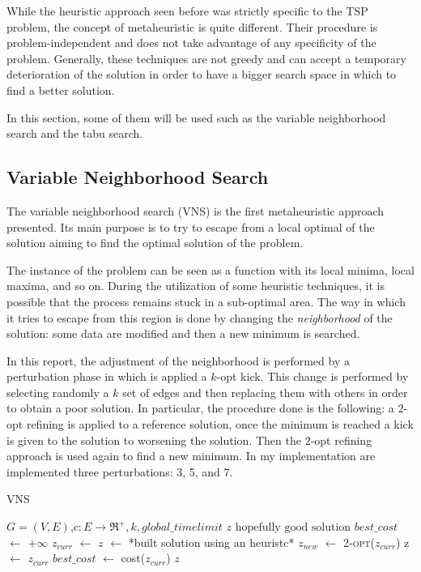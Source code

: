 While the heuristic approach seen before was strictly specific to the TSP problem, the concept of metaheuristic is quite different. Their procedure is problem-independent and does not take advantage of any specificity of the problem. Generally, these techniques are not greedy and can accept a temporary deterioration of the solution in order to have a bigger search space in which to find a better solution.

In this section, some of them will be used such as the variable neighborhood search and the tabu search.

\subsection{Variable Neighborhood Search}
\label{sec:VNS}
The variable neighborhood search (VNS) is the first metaheuristic approach presented. Its main purpose is to try to escape from a local optimal of the solution aiming to find the optimal solution of the problem. 

The instance of the problem can be seen as a function with its local minima, local maxima, and so on. During the utilization of some heuristic techniques, it is possible that the process remains stuck in a sub-optimal area. The way in which it tries to escape from this region is done by changing the \textit{neighborhood} of the solution: some data are modified and then a new minimum is searched.

In this report, the adjustment of the neighborhood is performed by a perturbation phase in which is applied a $k$-opt kick. This change is performed by selecting randomly a $k$ set of edges and then replacing them with others in order to obtain a poor solution. In particular, the procedure done is the following: a $2$-opt refining is applied to a reference solution, once the minimum is reached a kick is given to the solution to worsening the solution. Then the $2$-opt refining approach is used again to find a new minimum. In my implementation are implemented three perturbations: 3, 5, and 7.

\begin{algorithm}
	\caption{VNS}\label{algo:vns}
	\begin{algorithmic}[1]
		\Require $G=(V,E)$,$ c:E\rightarrow \Re^+, k, global\_timelimit$
		\Ensure $z\text{ hopefully good solution}$
		\State $best\_cost$ $\gets$ $+\infty$
		\State $z_{curr}$ $\gets$ $z$ $\gets$ *built solution using an heuristc*
			\State $z_{new}$ $\gets$ \textsc{2-opt($z_{curr}$)}
				\State z $\gets$ $z_{curr}$
				\State $best\_cost$ $\gets$ cost($z_{curr}$)
			\EndIf
		\EndWhile
		\State \Return $z$
	\end{algorithmic}
\end{algorithm}